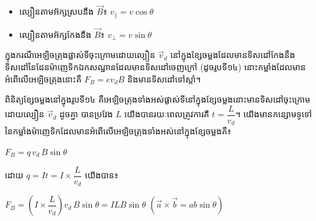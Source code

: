 \begin{itemize}[itemsep=2pt, topsep=4pt, parsep=0pt, leftmargin=1.6em]
	\item ល្បឿនតាមអ័ក្សស្របនឹង $\vec{B}$៖ $v_\parallel = v\cos\theta$
	\item ល្បឿនតាមអ័ក្សកែងនឹង $\vec{B}$៖ $v_\perp = v\sin\theta$
\end{itemize}

\vspace{0.9em}
\noindent
{}


\noindent
\begin{minipage}[t]{0.55\textwidth}
	\raggedright
	ក្នុងករណីអេឡិចត្រុងផ្លាស់ទីចុះក្រោមដោយល្បឿន $\vec{v}_d$ នៅក្នុងខ្សែចម្លងដែលមានទិសដៅកែងនឹងទិសដៅនៃដែនម៉ាញេទិកឯកសណ្ឋានដែលមានទិសដៅចេញក្រៅ (ដូចរូបទី១៤) នោះកម្លាំងដែលមានអំពើលើអេឡិចត្រុងនោះគឺ $F_B = ev_dB$ និងមានទិសដៅទៅស្តាំ។
\end{minipage}%
\hfill
\begin{minipage}[t]{0.40\textwidth}
	\vspace{0pt}
	\hspace*{0.5em}%
\end{minipage}

\vspace{0.7em}
\noindent
ពិនិត្យខ្សែចម្លងនៅក្នុងរូបទី១៤ គឺអេឡិចត្រុងទាំងអស់ផ្លាស់ទីនៅក្នុងខ្សែចម្លងនោះមានទិសដៅចុះក្រោមដោយល្បឿន $\vec{v}_d$ ដូចគ្នា បានប្រវែង $L$ យើងបានរយៈពេលត្រូវការគឺ $t = \dfrac{L}{v_d}$។ យើងមានកន្សោមទូទៅនៃកម្លាំងម៉ាញេទិកដែលមានអំពើលើអេឡិចត្រុងទាំងអស់នៅក្នុងខ្សែចម្លងគឺ៖

\vspace{0.4em}
\begin{center}
	$F_B = q\,v_d\,B\sin\theta$
\end{center}

\vspace{0.4em}
\noindent
ដោយ $q = It = I\times\dfrac{L}{v_d}$ យើងបាន៖

\vspace{0.4em}
\begin{center}
	$F_B = \left(I\times\dfrac{L}{v_d}\right)v_d\,B\sin\theta = ILB\sin\theta$ \quad $\left(\vec{a}\times\vec{b} = ab\sin\theta\right)$
\end{center}


